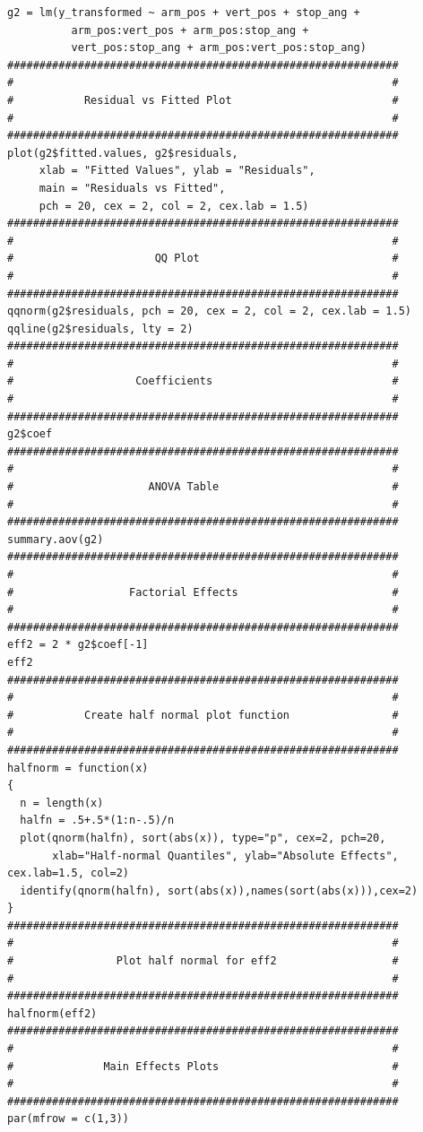 \documentclass[11pt]{article}
\begin{document}
\begin{verbatim}
g2 = lm(y_transformed ~ arm_pos + vert_pos + stop_ang + 
          arm_pos:vert_pos + arm_pos:stop_ang + 
          vert_pos:stop_ang + arm_pos:vert_pos:stop_ang)
#############################################################
#                                                           #
#           Residual vs Fitted Plot                         #
#                                                           #
#############################################################
plot(g2$fitted.values, g2$residuals,
     xlab = "Fitted Values", ylab = "Residuals",
     main = "Residuals vs Fitted",
     pch = 20, cex = 2, col = 2, cex.lab = 1.5)
#############################################################
#                                                           #
#                      QQ Plot                              #
#                                                           #
#############################################################
qqnorm(g2$residuals, pch = 20, cex = 2, col = 2, cex.lab = 1.5)
qqline(g2$residuals, lty = 2)
#############################################################
#                                                           #
#                   Coefficients                            #
#                                                           #
#############################################################
g2$coef
#############################################################
#                                                           #
#                     ANOVA Table                           #
#                                                           #
#############################################################
summary.aov(g2)
#############################################################
#                                                           #
#                  Factorial Effects                        #
#                                                           #
#############################################################
eff2 = 2 * g2$coef[-1]
eff2
#############################################################
#                                                           #
#           Create half normal plot function                #
#                                                           #
#############################################################
halfnorm = function(x)
{
  n = length(x)
  halfn = .5+.5*(1:n-.5)/n
  plot(qnorm(halfn), sort(abs(x)), type="p", cex=2, pch=20,
       xlab="Half-normal Quantiles", ylab="Absolute Effects", cex.lab=1.5, col=2)
  identify(qnorm(halfn), sort(abs(x)),names(sort(abs(x))),cex=2)
}
#############################################################
#                                                           #
#                Plot half normal for eff2                  #
#                                                           #
#############################################################
halfnorm(eff2)
#############################################################
#                                                           #
#              Main Effects Plots                           #
#                                                           #
#############################################################
par(mfrow = c(1,3))


\end{verbatim}
\end{document}
